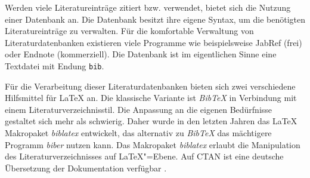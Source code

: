 Werden viele Literatureinträge zitiert bzw. verwendet, bietet sich die Nutzung
einer Datenbank an. Die Datenbank besitzt ihre eigene Syntax,
um die benötigten Literatureinträge zu verwalten. Für die komfortable Verwaltung
von Literaturdatenbanken existieren viele Programme wie beispielsweise JabRef (frei) oder
Endnote (kommerziell). Die Datenbank ist im eigentlichen Sinne eine Textdatei mit
Endung \lstinline|bib|.


Für die Verarbeitung dieser Literaturdatenbanken bieten sich zwei verschiedene
Hilfsmittel für \LaTeX{} an. Die klassische Variante ist \emph{Bib\TeX} in Verbindung
mit einem Literaturverzeichnisstil. Die Anpassung an die eigenen Bedürfnisse
gestaltet sich mehr als schwierig. Daher wurde in den letzten Jahren das \LaTeX{}
Makropaket \emph{biblatex} entwickelt, das alternativ zu \emph{Bib\TeX} das mächtigere
Programm \emph{biber} nutzen kann. Das Makropaket \emph{biblatex} erlaubt die Manipulation
des Literaturverzeichnisses auf \LaTeX"=Ebene. Auf CTAN ist eine deutsche Übersetzung der Dokumentation
verfügbar \cite{biblatex-de}.

\endinput
